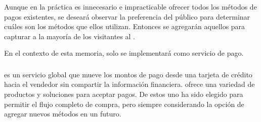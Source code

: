 	Aunque en la práctica es innecesario e impracticable ofrecer todos los métodos de pagos existentes, se deseará observar la preferencia del público para determinar cuáles son los métodos que ellos utilizan. Entonces se agregarán aquellos para capturar a la mayoría de los visitantes al \websiteINT \cite{online_kissmetrics_easy_payment_process}.

	En el contexto de esta memoria, solo se implementará \paypalNAME como servicio de pago.
	
	\subsubsection{\paypalNAME}

		\paypalNAME es un servicio global que mueve los montos de pago desde una tarjeta de crédito hacia el vendedor sin compartir la información financiera. \paypalNAME ofrece una variedad de productos y soluciones para aceptar pagos. De estos uno ha sido elegido para permitir el flujo completo de compra, pero siempre considerando la opción de agregar nuevos métodos en un futuro.



